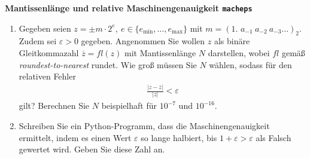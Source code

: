 \textbf{Mantissenlänge und relative Maschinengenauigkeit \texttt{macheps}}
\begin{enumerate}
	\item Gegeben seien $z = \pm m \cdot2^e,~ e \in \lbrace e_{\text{min}}, \dots, e_{\text{max}}\rbrace$ mit $m = (1\textbf{. }a_{-1}~a_{-2}~a_{-3} \dots)_2$.
	Zudem sei $\varepsilon > 0$ gegeben. Angenommen Sie wollen $z$ als binäre Gleitkommazahl $\overline{z}=fl(z)$ mit Mantissenlänge $N$ darstellen, wobei $fl$ gemäß \textit{roundest-to-nearest} rundet. Wie groß müssen Sie $N$ wählen, sodass für den relativen Fehler 
	\begin{align*}
	\frac{|z - \overline{z}|}{|z|} < \varepsilon
	\end{align*}
	gilt? Berechnen Sie $N$ beispielhaft für $10^{-7}$ und $10^{-16}$.
	
	\item Schreiben Sie ein Python-Programm, dass die Maschinengenauigkeit ermittelt, indem es einen Wert $\varepsilon$ so lange halbiert, bis
	$1 + \varepsilon > \varepsilon$ als Falsch gewertet wird. Geben Sie diese Zahl an.
\end{enumerate}